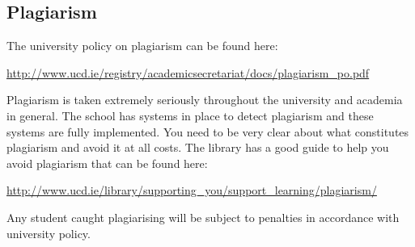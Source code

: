 \subsection*{Plagiarism}

The university policy on plagiarism can be found here:

\vspace{5mm}

\url{http://www.ucd.ie/registry/academicsecretariat/docs/plagiarism_po.pdf}

\vspace{5mm}

	Plagiarism is taken extremely seriously throughout the university and academia in general. The school has systems in place to detect plagiarism and these systems are fully implemented. You need to be very clear about what constitutes plagiarism and avoid it at all costs. The library has a good guide to help you avoid plagiarism that can be found here:

\vspace{5mm}

\url{http://www.ucd.ie/library/supporting_you/support_learning/plagiarism/}

\vspace{5mm}

	Any student caught plagiarising will be subject to penalties in accordance with university policy.   
